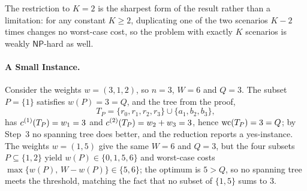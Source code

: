 The restriction to $K = 2$ is the sharpest form of the result rather than a limitation: for any constant $K \geq 2$, duplicating one of the two scenarios $K - 2$ times changes no worst-case cost, so the problem with exactly $K$ scenarios is weakly $\mathsf{NP}$-hard as well.

\paragraph{A Small Instance.}

Consider the weights $w = (3, 1, 2)$, so $n = 3$, $W = 6$ and $Q = 3$.
The subset $P = \{1\}$ satisfies $w(P) = 3 = Q$, and the tree from the proof,
\[
T_P = \{r_0, r_1, r_2, r_3\} \cup \{a_1, b_2, b_3\},
\]
has $c^{(1)}(T_P) = w_1 = 3$ and $c^{(2)}(T_P) = w_2 + w_3 = 3$, hence $\mathrm{wc}(T_P) = 3 = Q$; by Step~3 no spanning tree does better, and the reduction reports a yes-instance.
The weights $w = (1, 5)$ give the same $W = 6$ and $Q = 3$, but the four subsets $P \subseteq \{1, 2\}$ yield $w(P) \in \{0, 1, 5, 6\}$ and worst-case costs $\max\{w(P),\, W - w(P)\} \in \{5, 6\}$; the optimum is $5 > Q$, so no spanning tree meets the threshold, matching the fact that no subset of $\{1, 5\}$ sums to $3$.

%
%
%

